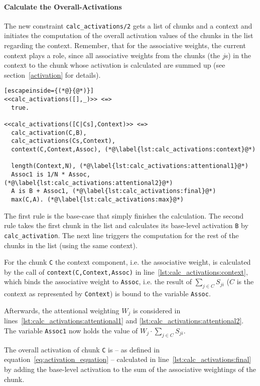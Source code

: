\paragraph{Calculate the Overall-Activations}

The new constraint \verb|calc_activations/2| gets a list of chunks and a context and initiates the computation of the overall activation values of the chunks in the list regarding the context. Remember, that for the associative weights, the current context plays a role, since all associative weights from the chunks (the $j$s) in the context to the chunk whose activation is calculated are summed up (see section~\ref{activation} for details).

\begin{lstlisting}[escapeinside={(*@}{@*)}]
<<calc_activations([],_)>> <=>
  true.
  
<<calc_activations([C|Cs],Context)>> <=> 
  calc_activation(C,B), 
  calc_activations(Cs,Context), 
  context(C,Context,Assoc), (*@\label{lst:calc_activations:context}@*)
  
  length(Context,N), (*@\label{lst:calc_activations:attentional1}@*)
  Assoc1 is 1/N * Assoc, (*@\label{lst:calc_activations:attentional2}@*)
  A is B + Assoc1, (*@\label{lst:calc_activations:final}@*)
  max(C,A). (*@\label{lst:calc_activations:max}@*)
\end{lstlisting}

The first rule is the base-case that simply finishes the calculation. The second rule takes the first chunk in the list and calculates its base-level activation \verb|B| by \verb|calc_activation|. The next line triggers the computation for the rest of the chunks in the list (using the same context).

For the chunk \verb|C| the context component, i.e. the associative weight, is calculated by the call of \verb|context(C,Context,Assoc)| in line~\ref{lst:calc_activations:context}, which binds the associative weight to \verb|Assoc|, i.e. the result of $\sum_{j \in C}{S_{ji}}$ ($C$ is the context as represented by \verb|Context|) is bound to the variable \verb|Assoc|.

Afterwards, the attentional weighting $W_j$ is considered in lines~\ref{lst:calc_activations:attentional1} and \ref{lst:calc_activations:attentional2}. The variable \verb|Assoc1| now holds the value of $W_j \cdot \sum_{j \in C}{S_{ji}}$.

The overall activation of chunk \verb|C| is -- as defined in equation~\eqref{eq:activation_equation} -- calculated in line~\ref{lst:calc_activations:final} by adding the base-level activation to the sum of the associative weightings of the chunk.


